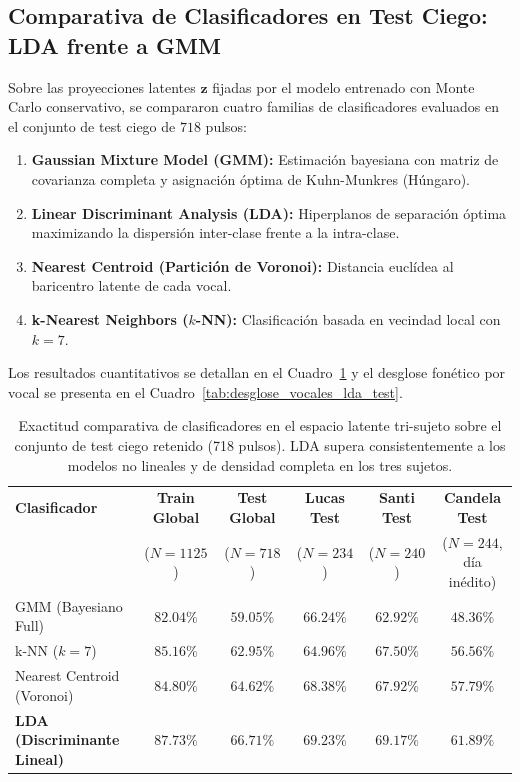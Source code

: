 \documentclass[11pt,a4paper,openany]{book}
\theoremstyle{definition}
\begin{document}
\subsection{Comparativa de Clasificadores en Test Ciego: LDA frente a GMM}
\label{subsec:comparativa_lda_gmm_test}

Sobre las proyecciones latentes $\mathbf{z}$ fijadas por el modelo entrenado con Monte Carlo conservativo, se compararon cuatro familias de clasificadores evaluados en el conjunto de test ciego de $718$ pulsos:
\begin{enumerate}
    \item \textbf{Gaussian Mixture Model (GMM):} Estimación bayesiana con matriz de covarianza completa y asignación óptima de Kuhn-Munkres (Húngaro).
    \item \textbf{Linear Discriminant Analysis (LDA):} Hiperplanos de separación óptima maximizando la dispersión inter-clase frente a la intra-clase.
    \item \textbf{Nearest Centroid (Partición de Voronoi):} Distancia euclídea al baricentro latente de cada vocal.
    \item \textbf{k-Nearest Neighbors ($k$-NN):} Clasificación basada en vecindad local con $k=7$.
\end{enumerate}

Los resultados cuantitativos se detallan en el Cuadro~\ref{tab:comparativa_clasificadores_holdout} y el desglose fonético por vocal se presenta en el Cuadro~\ref{tab:desglose_vocales_lda_test}.

\begin{table}[H]
\centering
\small
\begin{tabular}{lccccc}
\hline
\textbf{Clasificador} & \textbf{Train Global} & \textbf{Test Global} & \textbf{Lucas Test} & \textbf{Santi Test} & \textbf{Candela Test} \\
 & ($N = 1125$) & ($N = 718$) & ($N = 234$) & ($N = 240$) & ($N = 244$, día inédito) \\
\hline
GMM (Bayesiano Full) & $82.04\%$ & $59.05\%$ & $66.24\%$ & $62.92\%$ & $48.36\%$ \\
k-NN ($k=7$) & $85.16\%$ & $62.95\%$ & $64.96\%$ & $67.50\%$ & $56.56\%$ \\
Nearest Centroid (Voronoi) & $84.80\%$ & $64.62\%$ & $68.38\%$ & $67.92\%$ & $57.79\%$ \\
\textbf{LDA (Discriminante Lineal)} & $\mathbf{87.73\%}$ & $\mathbf{66.71\%}$ & $\mathbf{69.23\%}$ & $\mathbf{69.17\%}$ & $\mathbf{61.89\%}$ \\
\hline
\end{tabular}
\caption{Exactitud comparativa de clasificadores en el espacio latente tri-sujeto sobre el conjunto de test ciego retenido (718 pulsos). LDA supera consistentemente a los modelos no lineales y de densidad completa en los tres sujetos.}
\label{tab:comparativa_clasificadores_holdout}
\end{table}
\end{document}

